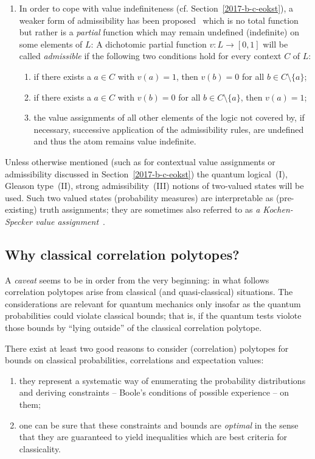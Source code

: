 \begin{enumerate}
\item
In order to cope with value indefiniteness (cf. Section~\ref{2017-b-c-eokst}),
a weaker form of admissibility has been proposed~\cite{Abbott:2010uq,2012-incomput-proofsCJ,PhysRevA.89.032109,2015-AnalyticKS}
which is no total function but rather is a {\em partial} function which may remain undefined (indefinite) on some elements of $L$:
A dichotomic partial function  $v: L \rightarrow [0,1]$  will be called
{\em admissible}
if  the following two conditions hold for every context $C$ of $L$:
\begin{enumerate}
\item     if there exists a $a\in C$ with $v(a)=1$, then $v(b)=0$ for all $b\in C\setminus\{a\}$;
\item    if there exists a $a\in C$ with $v(b)=0$ for all $b\in C\setminus\{a\}$, then $v(a)=1$;
\item     the value assignments of all other elements of the logic not covered by, if necessary, successive application of the admissibility rules,
are undefined and thus the atom remains value indefinite.
\end{enumerate}
\end{enumerate}

Unless otherwise mentioned (such as for contextual value assignments or admissibility discussed in Section~\ref{2017-b-c-eokst})
the quantum logical~(I), Gleason type~(II), strong admissibility~(III) notions of two-valued states will be used.
Such two valued states (probability measures) are interpretable as (pre-existing) truth assignments; they are
sometimes also referred to as {\em a Kochen-Specker value assignment}~\cite{PhysRevLett.108.030402}.



\subsection{Why classical correlation polytopes?}
\label{2017-b-wccp}

A {\em caveat} seems to be in order from the very beginning:
in what follows correlation polytopes arise from classical (and quasi-classical)
situations.
The considerations are relevant for quantum mechanics only insofar as the quantum probabilities could violate classical bounds;
that is, if the quantum tests violote those bounds by ``lying outside'' of the classical correlation polytope.

There exist at least two good reasons to consider (correlation) polytopes for bounds on classical probabilities, correlations and expectation values:
\begin{enumerate}
\item   they represent a systematic way of enumerating the probability distributions and deriving constraints --
Boole's conditions of possible experience -- on them;
\item    one can be sure that these constraints and bounds are {\em optimal} in the sense that they are guaranteed to yield inequalities which
are best criteria for classicality.
\end{enumerate}

